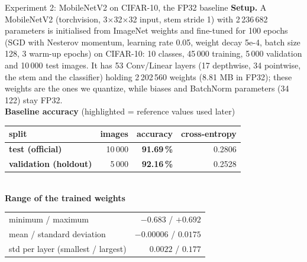 \documentclass[aspectratio=169,10pt]{beamer}
\newcommand{\hlrow}{\rowcolor{hl}}
\begin{document}
\begin{frame}{Experiment 2: MobileNetV2 on CIFAR-10, the FP32 baseline}
  \small
  \textbf{Setup.} A MobileNetV2 (torchvision, 3$\times$32$\times$32 input, stem stride 1) with 2\,236\,682 parameters is initialised from ImageNet weights and fine-tuned for 100 epochs
  (SGD with Nesterov momentum, learning rate 0.05, weight decay 5e-4, batch size 128, 3 warm-up epochs) on CIFAR-10: 10 classes, 45\,000 training, 5\,000 validation and 10\,000 test images.
  It has 53 Conv/Linear layers (17 depthwise, 34 pointwise, the stem and the classifier) holding 2\,202\,560 weights (8.81 MB in FP32); these weights are the ones we quantize,
  while biases and BatchNorm parameters (34\,122) stay FP32.\\[5mm]
  \centering
  \textbf{Baseline accuracy} (highlighted = reference values used later)\\[2mm]
  \begin{tabular}{lrrr}
    \toprule
    split & images & accuracy & cross-entropy\\
    \midrule
    \hlrow \textbf{test (official)} & 10\,000 & \textbf{91.69\,\%} & 0.2806\\
    \hlrow \textbf{validation (holdout)} & 5\,000 & \textbf{92.16\,\%} & 0.2528\\
    \bottomrule
  \end{tabular}\\[6mm]
  \textbf{Range of the trained weights}\\[2mm]
  \begin{tabular}{lr}
    \toprule
    minimum / maximum & $-0.683$ / $+0.692$\\
    mean / standard deviation & $-0.00006$ / $0.0175$\\
    std per layer (smallest / largest) & $0.0022$ / $0.177$\\
    \bottomrule
  \end{tabular}
\end{frame}
\end{document}
